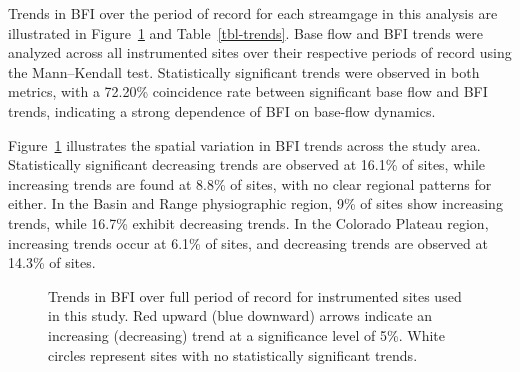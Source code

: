 \documentclass[
]{agujournal2019}
\begin{document}
Trends in BFI over the period of record for each streamgage in this
analysis are illustrated in Figure~\ref{fig-instrumented-trend} and
Table~\ref{tbl-trends}. Base flow and BFI trends were analyzed across
all instrumented sites over their respective periods of record using the
Mann--Kendall test. Statistically significant trends were observed in
both metrics, with a 72.20\% coincidence rate between significant base
flow and BFI trends, indicating a strong dependence of BFI on base-flow
dynamics.

Figure~\ref{fig-instrumented-trend} illustrates the spatial variation in
BFI trends across the study area. Statistically significant decreasing
trends are observed at 16.1\% of sites, while increasing trends are
found at 8.8\% of sites, with no clear regional patterns for either. In
the Basin and Range physiographic region, 9\% of sites show increasing
trends, while 16.7\% exhibit decreasing trends. In the Colorado Plateau
region, increasing trends occur at 6.1\% of sites, and decreasing trends
are observed at 14.3\% of sites.

\begin{figure}


\caption{\label{fig-instrumented-trend}Trends in BFI over full period of
record for instrumented sites used in this study. Red upward (blue
downward) arrows indicate an increasing (decreasing) trend at a
significance level of 5\%. White circles represent sites with no
statistically significant trends.}

\end{figure}%
\end{document}
